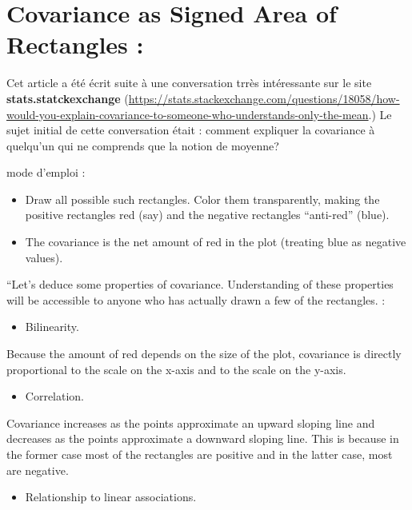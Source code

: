 \documentclass[
]{report}
\providecommand{\tightlist}{%
  \setlength{\itemsep}{0pt}\setlength{\parskip}{0pt}}
\begin{document}
\hypertarget{covariance-as-signed-area-of-rectangles}{%
\section{Covariance as Signed Area of Rectangles :}\label{covariance-as-signed-area-of-rectangles}}

Cet article \citep{Chudzicki} a été écrit suite à une conversation trrès intéressante sur le site \textbf{stats.statckexchange} (\url{https://stats.stackexchange.com/questions/18058/how-would-you-explain-covariance-to-someone-who-understands-only-the-mean}.) Le sujet initial de cette conversation était : comment expliquer la covariance à quelqu'un qui ne comprends que la notion de moyenne?

mode d'emploi :

\begin{itemize}
\tightlist
\item
  Draw all possible such rectangles. Color them transparently, making the positive rectangles red (say) and the negative rectangles ``anti-red'' (blue).
\item
  The covariance is the net amount of red in the plot (treating blue as negative values).
\end{itemize}

``Let's deduce some properties of covariance. Understanding of these properties will be accessible to anyone who has actually drawn a few of the rectangles. :

\begin{itemize}
\tightlist
\item
  Bilinearity.
\end{itemize}

Because the amount of red depends on the size of the plot, covariance is directly proportional to the scale on the x-axis and to the scale on the y-axis.

\begin{itemize}
\tightlist
\item
  Correlation.
\end{itemize}

Covariance increases as the points approximate an upward sloping line and decreases as the points approximate a downward sloping line. This is because in the former case most of the rectangles are positive and in the latter case, most are negative.

\begin{itemize}
\tightlist
\item
  Relationship to linear associations.
\end{itemize}
\end{document}
